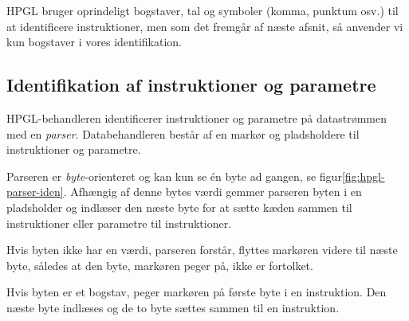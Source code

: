 HPGL bruger oprindeligt bogstaver, tal og symboler (komma, punktum
osv.) til at identificere instruktioner, men som det fremgår af næste
afsnit, så anvender vi kun bogstaver i vores identifikation.

\subsection{Identifikation af instruktioner og parametre}
\label{sc:idn-ins-param}


HPGL-behandleren identificerer instruktioner og parametre på
datastrømmen med en \textit{parser}. Databehandleren består af en
markør og pladsholdere til instruktioner og parametre.

Parseren er \textit{byte}-orienteret og kan kun se én byte ad gangen,
se figur\vref{fig:hpgl-parser-iden}. Afhængig af denne bytes værdi
gemmer parseren byten i en pladsholder og indlæser den næste byte for
at sætte kæden sammen til instruktioner eller parametre til
instruktioner.


Hvis byten ikke har en værdi, parseren forstår, flyttes markøren
videre til næste byte, således at den byte, markøren peger på, ikke er
fortolket.

Hvis byten er et bogstav, peger markøren på første byte i en
instruktion. Den næste byte indlæses og de to byte sættes sammen til
en instruktion.

